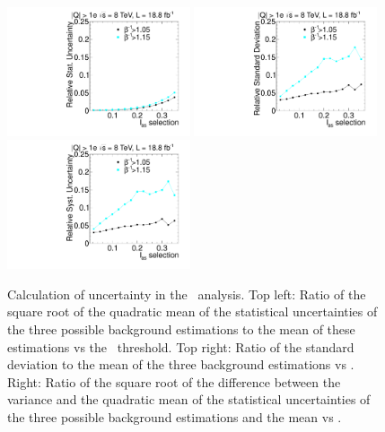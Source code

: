 \begin{figure}
 \begin{center}
 \includegraphics[clip=false, trim=0.0cm 0cm 0.0cm 0cm, width=0.48\textwidth]{figures/multi/Data8TeVCollisionStat}
 \includegraphics[clip=false, trim=0.0cm 0cm 0.0cm 0cm, width=0.48\textwidth]{figures/multi/Data8TeVCollisionStatSyst} \\
 \includegraphics[clip=false, trim=0.0cm 0cm 0.0cm 0cm, width=0.48\textwidth]{figures/multi/Data8TeVCollisionSyst}
\end{center}
\caption[Statistical and systematic uncertainty in the background prediction for different sets of thresholds in the \multi\ analysis]
{
Calculation of uncertainty in the \multi\ analysis.
Top left: Ratio of the square root of the quadratic
mean of the statistical uncertainties of the three possible background
estimations to the mean of these estimations vs
the \ias\ threshold. Top right: Ratio of the standard deviation to the mean of the three
background estimations vs \ias. Right: Ratio of the
square root of the difference between the variance and the quadratic
mean of the statistical uncertainties  of the three possible background
estimations and the mean vs \ias.
}
\label{fig:mCHAMPcorr2}
\end{figure}
